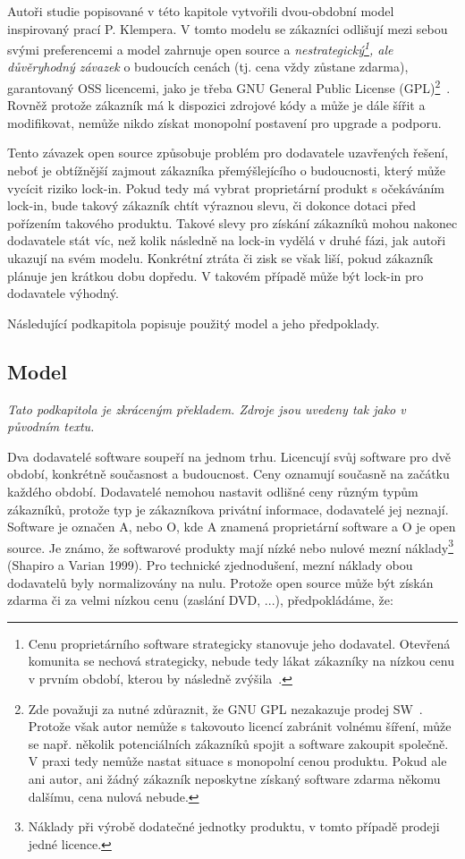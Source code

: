 \begin{multicols}{2}
	Autoři studie popisované v této kapitole vytvořili dvou-obdobní model inspirovaný prací P. Klempera. V tomto modelu se zákazníci odlišují mezi sebou svými preferencemi a model zahrnuje open source a {\em nestrategický\footnote{Cenu proprietárního software strategicky stanovuje jeho dodavatel. Otevřená komunita se nechová strategicky, nebude tedy lákat zákazníky na nízkou cenu v prvním období, kterou by následně zvýšila~\cite[str. 2]{lock-in-competition}.}, ale důvěryhodný závazek} o budoucích cenách (tj. cena vždy zůstane zdarma), garantovaný OSS licencemi, jako je třeba GNU General Public License (GPL)\footnote{Zde považuji za nutné zdůraznit, že GNU GPL nezakazuje prodej SW~\cite{selling-foss}. Protože však autor nemůže s takovouto licencí zabránit volnému šíření, může se např. několik potenciálních zákazníků spojit a software zakoupit společně. V praxi tedy nemůže nastat situace s monopolní cenou produktu. Pokud ale ani autor, ani žádný zákazník neposkytne získaný software zdarma někomu dalšímu, cena nulová nebude.}~\cite[str. 2]{lock-in-competition}. Rovněž protože zákazník má k dispozici zdrojové kódy a může je dále šířit a modifikovat, nemůže nikdo získat monopolní postavení pro upgrade a podporu.

	Tento závazek open source způsobuje problém pro dodavatele uzavřených řešení, neboť je obtížnější zajmout zákazníka přemýšlejícího o budoucnosti, který může vycícit riziko lock-in. Pokud tedy má vybrat proprietární produkt s očekáváním lock-in, bude takový zákazník chtít výraznou slevu, či dokonce dotaci před pořízením takového produktu. Takové slevy pro získání zákazníků mohou nakonec dodavatele stát víc, než kolik následně na lock-in vydělá v druhé fázi, jak autoři ukazují na svém modelu. Konkrétní ztráta či zisk se však liší, pokud zákazník plánuje jen krátkou dobu dopředu. V takovém případě může být lock-in pro dodavatele výhodný.

	Následující podkapitola popisuje použitý model a jeho předpoklady.

	\subsection*{Model}
	{\em Tato podkapitola je zkráceným překladem. Zdroje jsou uvedeny tak jako v původním textu.}

	Dva dodavatelé software soupeří na jednom trhu. Licencují svůj software pro dvě období, konkrétně současnost a budoucnost. Ceny oznamují současně na začátku každého období. Dodavatelé nemohou nastavit odlišné ceny různým typům zákazníků, protože typ je zákazníkova privátní informace, dodavatelé jej neznají. Software je označen A, nebo O, kde A znamená proprietární software a O je open source. Je známo, že softwarové produkty mají nízké nebo nulové mezní náklady\footnote{Náklady při výrobě dodatečné jednotky produktu, v tomto případě prodeji jedné licence.} (Shapiro a Varian 1999). Pro technické zjednodušení, mezní náklady obou dodavatelů byly normalizovány na nulu. Protože open source může být získán zdarma či za velmi nízkou cenu (zaslání DVD, ...), předpokládáme, že:


\end{multicols}
